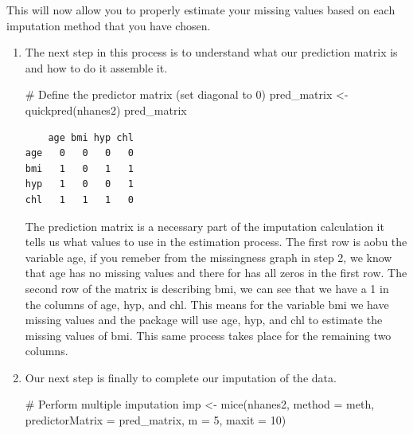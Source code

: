 \documentclass[
  letterpaper,
  DIV=11,
  numbers=noendperiod]{scrreprt}
\newenvironment{Shaded}{\begin{snugshade}}{\end{snugshade}}
\newcommand{\AttributeTok}[1]{\textcolor[rgb]{0.40,0.45,0.13}{#1}}
\newcommand{\CommentTok}[1]{\textcolor[rgb]{0.37,0.37,0.37}{#1}}
\newcommand{\DecValTok}[1]{\textcolor[rgb]{0.68,0.00,0.00}{#1}}
\newcommand{\FunctionTok}[1]{\textcolor[rgb]{0.28,0.35,0.67}{#1}}
\newcommand{\NormalTok}[1]{\textcolor[rgb]{0.00,0.23,0.31}{#1}}
\newcommand{\OtherTok}[1]{\textcolor[rgb]{0.00,0.23,0.31}{#1}}
\begin{document}
This will now allow you to properly estimate your missing values based
on each imputation method that you have chosen.

\begin{enumerate}
\def\labelenumi{\arabic{enumi}.}
\setcounter{enumi}{3}
\item
  The next step in this process is to understand what our prediction
  matrix is and how to do it assemble it.

\begin{Shaded}
\begin{Highlighting}[]
\CommentTok{\# Define the predictor matrix (set diagonal to 0)}
\NormalTok{pred\_matrix }\OtherTok{\textless{}{-}} \FunctionTok{quickpred}\NormalTok{(nhanes2)}
\NormalTok{pred\_matrix}
\end{Highlighting}
\end{Shaded}

\begin{verbatim}
    age bmi hyp chl
age   0   0   0   0
bmi   1   0   1   1
hyp   1   0   0   1
chl   1   1   1   0
\end{verbatim}

  The prediction matrix is a necessary part of the imputation
  calculation it tells us what values to use in the estimation process.
  The first row is aobu the variable age, if you remeber from the
  missingness graph in step 2, we know that age has no missing values
  and there for has all zeros in the first row. The second row of the
  matrix is describing bmi, we can see that we have a 1 in the columns
  of age, hyp, and chl. This means for the variable bmi we have missing
  values and the package will use age, hyp, and chl to estimate the
  missing values of bmi. This same process takes place for the remaining
  two columns.
\item
  Our next step is finally to complete our imputation of the data.

\begin{Shaded}
\begin{Highlighting}[]
\CommentTok{\# Perform multiple imputation}
\NormalTok{imp }\OtherTok{\textless{}{-}} \FunctionTok{mice}\NormalTok{(nhanes2, }\AttributeTok{method =}\NormalTok{ meth, }\AttributeTok{predictorMatrix =}\NormalTok{ pred\_matrix, }\AttributeTok{m =} \DecValTok{5}\NormalTok{, }\AttributeTok{maxit =} \DecValTok{10}\NormalTok{)}
\end{Highlighting}
\end{Shaded}

\begin{verbatim}


\end{verbatim}
\end{enumerate}
\end{document}
